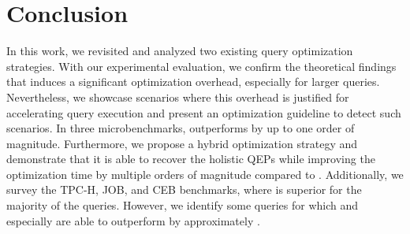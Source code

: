 \section{Conclusion}
\label{sec:conclusion}

In this work, we revisited and analyzed two existing query optimization strategies.  With our experimental evaluation, we confirm the theoretical findings that \holistic induces a significant optimization overhead, especially for larger queries.  Nevertheless, we showcase scenarios where this overhead is justified for accelerating query execution and present an optimization guideline to detect such scenarios.  In three microbenchmarks, \holistic outperforms \split by up to one order of magnitude.  Furthermore, we propose a hybrid \topk optimization strategy and demonstrate that it is able to recover the holistic QEPs while improving the optimization time by multiple orders of magnitude compared to \holistic.  Additionally, we survey the TPC-H, JOB, and CEB benchmarks, where \split is superior for the majority of the queries.  However, we identify some queries for which \holistic and especially \topk are able to outperform \split by approximately .  
